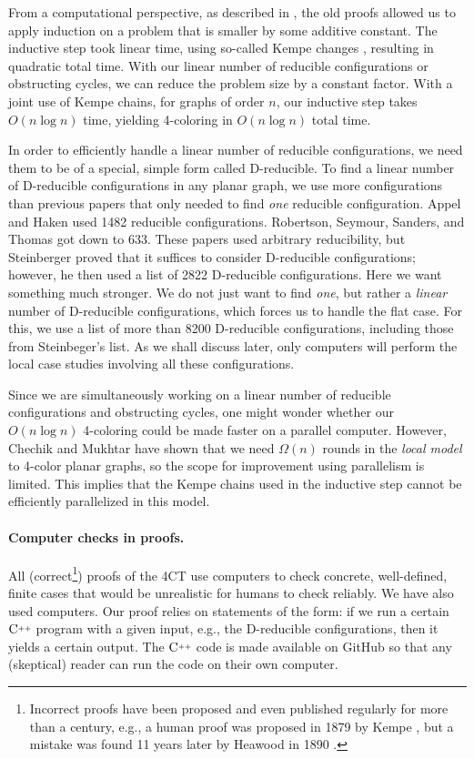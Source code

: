\documentclass[10pt,a4paper]{article}
\def\Cpp{\textnormal C\raisebox{0.5ex}{\tiny++}}
\begin{document}
From a computational perspective, as described in \cite{RSST-STOC}, the old proofs allowed us to apply induction on a problem that is smaller by some additive constant. The inductive step took linear time, using so-called Kempe changes \cite{kempe1879}, resulting in quadratic total time.
With our linear number of reducible configurations or obstructing cycles, we can reduce the problem size by a constant factor. With a joint use of Kempe chains, for graphs of order $n$, our inductive step takes $O(n\log n)$ time, yielding 4-coloring in $O(n\log n)$ total time.

In order to efficiently handle a linear number of reducible configurations, we need them to be of a special, simple form called D-reducible. 
To find a linear number of D-reducible configurations in any planar graph, we use more configurations than previous papers that only needed to find \emph{one} reducible configuration.
Appel and Haken \cite{AppelHaken89} used 1482 reducible configurations. Robertson, Seymour, Sanders, and Thomas \cite{RSST} got down to 
633. These papers used arbitrary reducibility, but Steinberger \cite{steinberger2010unavoidable} proved that it suffices to consider D-reducible configurations; however, he then used a list of 2822 D-reducible configurations. Here we want something much stronger. We do not just want to find \emph{one}, but rather a \emph{linear} number of D-reducible configurations, which forces us to handle the flat case. For this, we use a list of more than 8200 D-reducible configurations, including those from Steinbeger's list.
As we shall discuss later, only computers will perform the local case studies involving all these configurations.


Since we are simultaneously working on a linear number of reducible configurations and obstructing cycles, one might wonder whether our $O(n\log n)$ 4-coloring could be made faster on a parallel computer. However, Chechik and Mukhtar \cite{CM19}
have shown that we need $\Omega(n)$ rounds in the \emph{local model} to 4-color
planar graphs, so the scope for improvement using parallelism is limited. This implies that the Kempe chains used in the inductive step cannot be efficiently parallelized in this model.

\paragraph{Computer checks in proofs.}
All (correct\footnote{Incorrect proofs have been proposed and even published regularly for more than a century, e.g.,
a human proof was proposed in 1879 by Kempe \cite{kempe1879}, but a 
mistake was found 11 years later by Heawood in 1890 \cite{heawood1890}.}) 
proofs of the 4CT use computers to check concrete, well-defined, finite cases that would be unrealistic for humans to check reliably. We have also used computers. Our proof relies on statements of the form: if we run a certain $\Cpp$ program with a given input, e.g., the D-reducible configurations, then it yields a certain output. 
The $\Cpp$ code is made available on GitHub
so that any (skeptical) reader can run the code on their own computer. 
\end{document}

